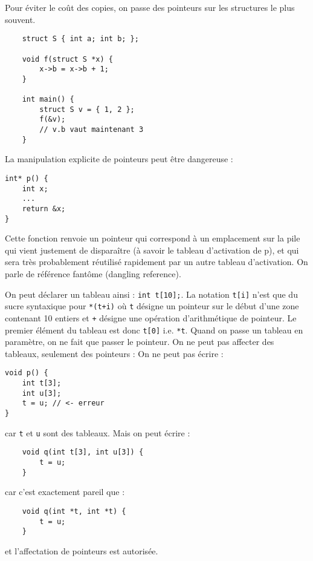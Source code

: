 \documentclass{cours}
\begin{document}
Pour éviter le coût des copies, on passe des pointeurs sur les structures le plus souvent.
\begin{verbatim}
    struct S { int a; int b; };

    void f(struct S *x) {
        x->b = x->b + 1;
    }

    int main() {
        struct S v = { 1, 2 };
        f(&v);
        // v.b vaut maintenant 3
    }
\end{verbatim}

La manipulation explicite de pointeurs peut être dangereuse :
\begin{verbatim}
int* p() {
    int x;
    ...
    return &x;
}
\end{verbatim}

Cette fonction renvoie un pointeur qui correspond à un emplacement sur la pile qui vient justement de disparaître (à savoir le tableau d'activation de p), et qui sera très probablement réutilisé rapidement par un autre tableau d'activation.
On parle de référence fantôme (dangling reference).

On peut déclarer un tableau ainsi : \texttt{int t[10];}. La notation \texttt{t[i]} n'est que du sucre syntaxique pour \texttt{*(t+i)} où \texttt{t} désigne un pointeur sur le début d'une zone contenant 10 entiers et \texttt{+} désigne une opération d'arithmétique de pointeur. Le premier élément du tableau est donc \texttt{t[0]} i.e. \texttt{*t}. Quand on passe un tableau en paramètre, on ne fait que passer le pointeur. On ne peut pas affecter des tableaux, seulement des pointeurs :
On ne peut pas écrire :
\begin{verbatim}
void p() {
    int t[3];
    int u[3];
    t = u; // <- erreur
}
\end{verbatim}
car \texttt{t} et \texttt{u} sont des tableaux.
Mais on peut écrire :
\begin{verbatim}
    void q(int t[3], int u[3]) {
        t = u;
    }
\end{verbatim}
car c'est exactement pareil que :
\begin{verbatim}
    void q(int *t, int *t) {
        t = u;
    }
\end{verbatim}
et l'affectation de pointeurs est autorisée.
\end{document}
